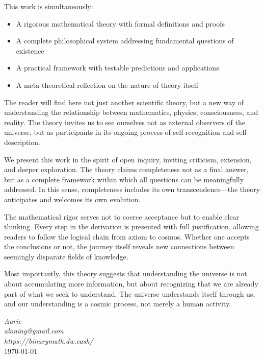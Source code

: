 This work is simultaneously:
\begin{itemize}
\item A rigorous mathematical theory with formal definitions and proofs
\item A complete philosophical system addressing fundamental questions of existence
\item A practical framework with testable predictions and applications
\item A meta-theoretical reflection on the nature of theory itself
\end{itemize}

The reader will find here not just another scientific theory, but a new way of understanding the relationship between mathematics, physics, consciousness, and reality. The theory invites us to see ourselves not as external observers of the universe, but as participants in its ongoing process of self-recognition and self-description.

We present this work in the spirit of open inquiry, inviting criticism, extension, and deeper exploration. The theory claims completeness not as a final answer, but as a complete framework within which all questions can be meaningfully addressed. In this sense, completeness includes its own transcendence---the theory anticipates and welcomes its own evolution.

The mathematical rigor serves not to coerce acceptance but to enable clear thinking. Every step in the derivation is presented with full justification, allowing readers to follow the logical chain from axiom to cosmos. Whether one accepts the conclusions or not, the journey itself reveals new connections between seemingly disparate fields of knowledge.

Most importantly, this theory suggests that understanding the universe is not about accumulating more information, but about recognizing that we are already part of what we seek to understand. The universe understands itself through us, and our understanding is a cosmic process, not merely a human activity.

\begin{flushright}
\textit{Auric}\\
\textit{aloning@gmail.com}\\
\textit{https://binarymath.dw.cash/}\\
\today
\end{flushright}